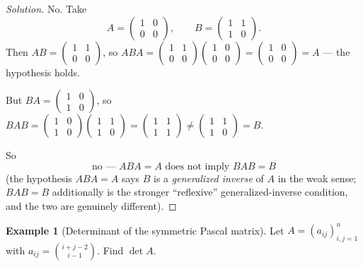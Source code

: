 \documentclass[11pt]{article}
\theoremstyle{definition}
\newtheorem{example}{Example}[section]
\begin{document}
\begin{proof}[Solution]
No. Take
\[
A=\begin{pmatrix}1&0\\0&0\end{pmatrix},\qquad B=\begin{pmatrix}1&1\\1&0\end{pmatrix}.
\]
Then $AB=\begin{pmatrix}1&1\\0&0\end{pmatrix}$, so $ABA=\begin{pmatrix}1&1\\0&0\end{pmatrix}\begin{pmatrix}1&0\\0&0\end{pmatrix}=\begin{pmatrix}1&0\\0&0\end{pmatrix}=A$ — the hypothesis holds.

But $BA=\begin{pmatrix}1&0\\1&0\end{pmatrix}$, so $BAB=\begin{pmatrix}1&0\\1&0\end{pmatrix}\begin{pmatrix}1&1\\1&0\end{pmatrix}=\begin{pmatrix}1&1\\1&1\end{pmatrix}\neq\begin{pmatrix}1&1\\1&0\end{pmatrix}=B$.

So
\[
\boxed{\text{no — } ABA=A \text{ does not imply } BAB=B}
\]
(the hypothesis $ABA=A$ says $B$ is a \emph{generalized inverse} of $A$ in the weak sense; $BAB=B$ additionally is the stronger ``reflexive'' generalized-inverse condition, and the two are genuinely different).
\end{proof}

\begin{example}[Determinant of the symmetric Pascal matrix]
Let $A=(a_{ij})_{i,j=1}^n$ with $a_{ij}=\binom{i+j-2}{i-1}$. Find $\det A$.
\end{example}
\end{document}
